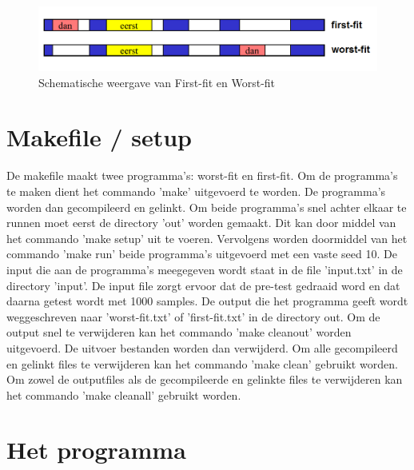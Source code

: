 \documentclass[a4paper]{article}
\begin{document}
	\begin{figure}[h]
		\begin{center}
		\includegraphics[width=1\textwidth]{geheugenbeheer.png}
		\caption{Schematische weergave van First-fit en Worst-fit}
		\end{center}
	\end{figure}

	\newpage

	\section{Makefile / setup}\label{sec:makefile}
		De makefile maakt twee programma's: worst-fit en first-fit.
		Om de programma's te maken dient het commando 'make' uitgevoerd te worden.
		De programma's worden dan gecompileerd en gelinkt.
		Om beide programma's snel achter elkaar te runnen moet eerst de directory 'out' worden gemaakt.
		Dit kan door middel van het commando 'make setup' uit te voeren.
		Vervolgens worden doormiddel van het commando 'make run' beide programma's uitgevoerd met een vaste seed 10.
		De input die aan de programma's meegegeven wordt staat in de file 'input.txt' in de directory 'input'.
		De input file zorgt ervoor dat de pre-test gedraaid word en dat daarna getest wordt met 1000 samples.
		De output die het programma geeft wordt weggeschreven naar 'worst-fit.txt' of 'first-fit.txt' in de directory out.
		Om de output snel te verwijderen kan het commando 'make cleanout' worden uitgevoerd.
		De uitvoer bestanden worden dan verwijderd.
		Om alle gecompileerd en gelinkt files te verwijderen kan het commando 'make clean' gebruikt worden.
		Om zowel de outputfiles als de gecompileerde en gelinkte files te verwijderen kan het commando 'make cleanall' gebruikt worden.

	\section{Het programma}\label{sec:programma}	
\end{document}
